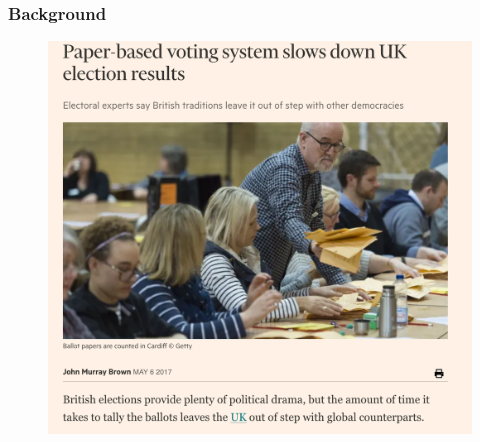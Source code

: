 \documentclass{beamer}
\begin{document}
%


\begin{frame}
\frametitle{Background}
\begin{figure}
	\begin{center}
	\includegraphics[scale=0.25]{uk-election.png}
	\end{center}
  \end{figure} 
\end{frame}
\end{document}
